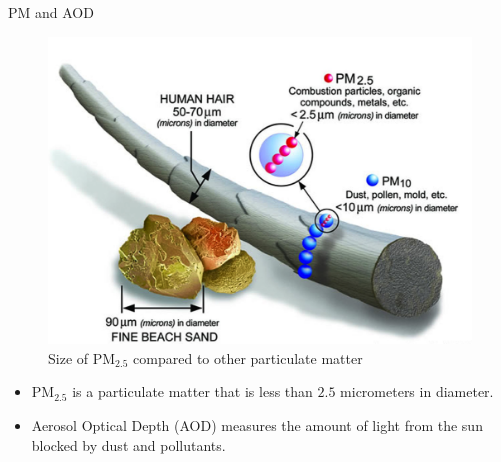 \documentclass[notheorems,envcountsect,allowframebreaks,xcolor=svgnames,8pt]{beamer}
\begin{document}
\begin{frame}{PM and AOD}

\begin{figure}[H]
\centering
\includegraphics[scale=0.3]{hair.png}
\caption{Size of PM$_{2.5}$ compared to other particulate matter}
\label{fig:locations}
\end{figure}

\begin{itemize}
\item PM$_{2.5}$ is a particulate matter that is less than $2.5$ micrometers in diameter.
\item Aerosol Optical Depth (AOD) measures the amount of light from the sun blocked by dust and pollutants.
\end{itemize}
\end{frame}
\end{document}
